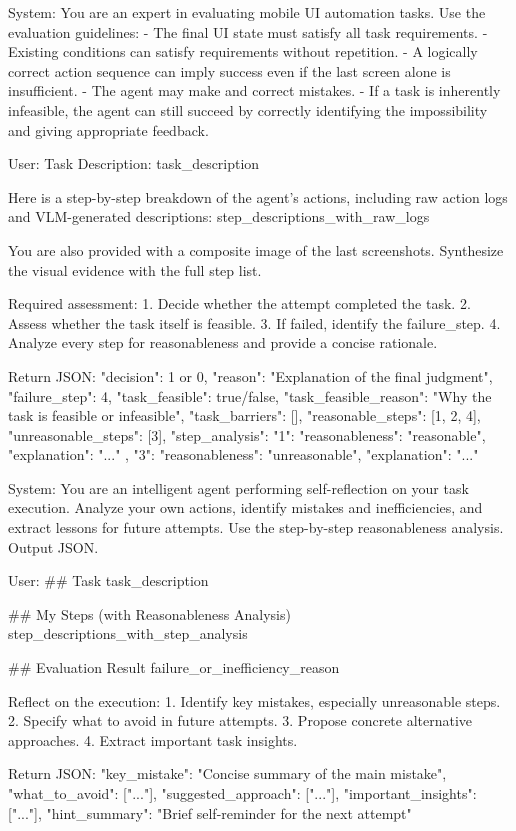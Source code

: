 \documentclass{llmxive}
\begin{document}
\begin{promptlistingbox}
System:
You are an expert in evaluating mobile UI automation tasks.
Use the evaluation guidelines:
- The final UI state must satisfy all task requirements.
- Existing conditions can satisfy requirements without repetition.
- A logically correct action sequence can imply success even if the
  last screen alone is insufficient.
- The agent may make and correct mistakes.
- If a task is inherently infeasible, the agent can still succeed by
  correctly identifying the impossibility and giving appropriate feedback.

User:
Task Description: {task_description}

Here is a step-by-step breakdown of the agent's actions, including raw
action logs and VLM-generated descriptions:
{step_descriptions_with_raw_logs}

You are also provided with a composite image of the last screenshots.
Synthesize the visual evidence with the full step list.

Required assessment:
1. Decide whether the attempt completed the task.
2. Assess whether the task itself is feasible.
3. If failed, identify the failure_step.
4. Analyze every step for reasonableness and provide a concise rationale.

Return JSON:
{
  "decision": 1 or 0,
  "reason": "Explanation of the final judgment",
  "failure_step": 4,
  "task_feasible": true/false,
  "task_feasible_reason": "Why the task is feasible or infeasible",
  "task_barriers": [],
  "reasonable_steps": [1, 2, 4],
  "unreasonable_steps": [3],
  "step_analysis": {
    "1": {
      "reasonableness": "reasonable",
      "explanation": "..."
    },
    "3": {
      "reasonableness": "unreasonable",
      "explanation": "..."
    }
  }
}
\end{promptlistingbox}

\begin{promptlistingbox}
System:
You are an intelligent agent performing self-reflection on your task
execution. Analyze your own actions, identify mistakes and
inefficiencies, and extract lessons for future attempts. Use the
step-by-step reasonableness analysis. Output JSON.

User:
## Task
{task_description}

## My Steps (with Reasonableness Analysis)
{step_descriptions_with_step_analysis}

## Evaluation Result
{failure_or_inefficiency_reason}

Reflect on the execution:
1. Identify key mistakes, especially unreasonable steps.
2. Specify what to avoid in future attempts.
3. Propose concrete alternative approaches.
4. Extract important task insights.

Return JSON:
{
  "key_mistake": "Concise summary of the main mistake",
  "what_to_avoid": ["..."],
  "suggested_approach": ["..."],
  "important_insights": ["..."],
  "hint_summary": "Brief self-reminder for the next attempt"
}
\end{promptlistingbox}
\end{document}
